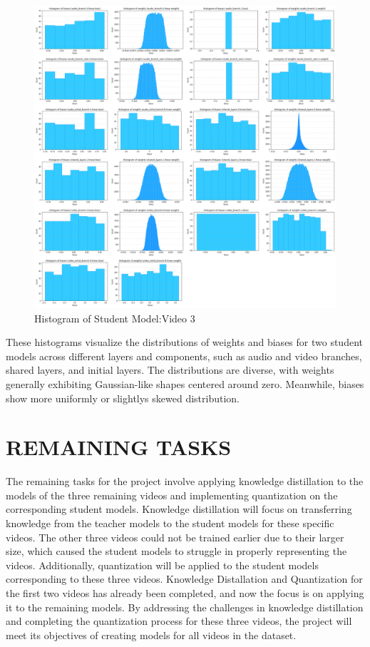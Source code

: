 \documentclass{ioereport}
\begin{document}
    \begin{figure}[H]
        \centering
        \includegraphics[width=\linewidth]{assets/quantization/histogram/histogram_rick_student.png}
        \caption{Histogram of Student Model:Video 3}
        \label{fig:hist-student-vid3}
    \end{figure}

    These histograms visualize the distributions of weights and biases for two student models across different layers and components, such as audio and video branches, shared layers, and initial layers. The distributions are diverse, with weights generally exhibiting Gaussian-like shapes centered around zero. Meanwhile, biases show more uniformly or slightlys skewed distribution.
    \pagebreak


\section{\MakeUppercase{Remaining Tasks}}
The remaining tasks for the project involve applying knowledge distillation to the models of the three remaining videos and implementing quantization on the corresponding student models. Knowledge distillation will focus on transferring knowledge from the teacher models to the student models for these specific videos. The other three videos could not be trained earlier due to their larger size, which caused the student models to struggle in properly representing the videos.
Additionally, quantization will be applied to the student models corresponding to these three videos. Knowledge Distallation and Quantization for the first two videos has already been completed, and now the focus is on applying it to the remaining models. By addressing the challenges in knowledge distillation and completing the quantization process for these three videos, the project will meet its objectives of creating models for all videos in the dataset.
\pagebreak
\end{document}
